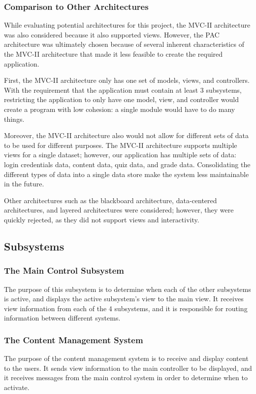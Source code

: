 \documentclass[]{article}
\begin{document}
\subsubsection{Comparison to Other Architectures}
While evaluating potential architectures for this project, the MVC-II 
architecture was also considered because it also supported views. However, the 
PAC architecture was ultimately chosen because of several inherent 
characteristics of the MVC-II architecture that made it less feasible to create 
the required application.

First, the MVC-II architecture only has one set of models, views, and 
controllers. With the requirement that the application must contain at least 3 
subsystems, restricting the application to only have one model, view, and 
controller would create a program with low cohesion: a single module would have 
to do many things.

Moreover, the MVC-II architecture also would not allow for different sets of 
data to be used for different purposes. The MVC-II architecture supports 
multiple views for a single dataset; however, our application has multiple sets 
of data: login credentials data, content data, quiz data, and grade data. 
Consolidating the different types of data into a single data store make the 
system less maintainable in the future.

Other architectures such as the blackboard architecture, data-centered architectures, and layered architectures were considered; 
however, they were quickly rejected, as they did not support views and 
interactivity.

\subsection{Subsystems}
\label{sub:subsystems}
\subsubsection{The Main Control Subsystem}
The purpose of this subsystem is to determine when each of the other subsystems 
is active, and displays the active subsystem's view to the main view. It 
receives view information from each of the 4 subsystems, and it is responsible 
for routing information between different systems.

\subsubsection{The Content Management System}
The purpose of the content management system is to receive and display content 
to the users. It sends view information to the main controller to be displayed, 
and it receives messages from the main control system in order to determine when 
to activate. 
\end{document}
